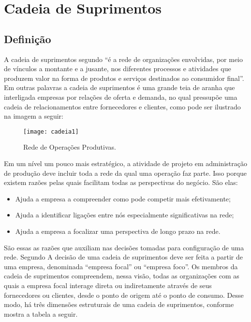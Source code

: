 \chapter[Cadeia de Suprimentos ]{Cadeia de Suprimentos}
\label{chap:cadeia}
	
	\section[Definição]{Definição}
	\label{sec:cadeia_definicao}

		A cadeia de suprimentos segundo \cite{martin} “é a rede de organizações envolvidas, por meio de vínculos a montante e a jusante, nos diferentes processos e atividades que produzem valor na forma de produtos e serviços destinados ao consumidor final”. Em outras palavras a cadeia de suprimentos é uma grande teia de aranha que interligada empresas por relações de oferta e demanda, no qual pressupõe uma cadeia de relacionamentos entre fornecedores e clientes, como pode ser ilustrado na imagem a seguir:

		\begin{figure}[h]
			\centering
			\texttt{[image: cadeia1]}
			\caption[Rede de Operações Produtivas]{Rede de Operações Produtivas.}
			\label{fig:cadeia1}
		\end{figure}

		Em um nível um pouco mais estratégico, a atividade de projeto em administração de produção deve incluir toda a rede da qual uma operação faz parte. Isso porque existem razões pelas quais facilitam todas as perspectivas do negócio. São elas:

		\begin{itemize}
			\item{Ajuda a empresa a compreender como pode competir mais efetivamente;}
			\item{Ajuda a identificar ligações entre nós especialmente significativas na rede;}
			\item{Ajuda a empresa a focalizar uma perspectiva de longo prazo na rede.}
		\end{itemize}

		São essas as razões que auxiliam nas decisões tomadas para configuração de uma rede. Segundo \cite{filho} A decisão de uma cadeia de suprimentos deve ser feita a partir de uma empresa, denominada “empresa focal” ou “empresa foco”. Os membros da cadeia de suprimentos compreendem, nessa visão, todas as organizações com as quais a empresa focal interage direta ou indiretamente através de seus fornecedores ou clientes, desde o ponto de origem até o ponto de consumo. Desse modo, há três dimensões estruturais de uma cadeia de suprimentos, conforme mostra a tabela a seguir.


